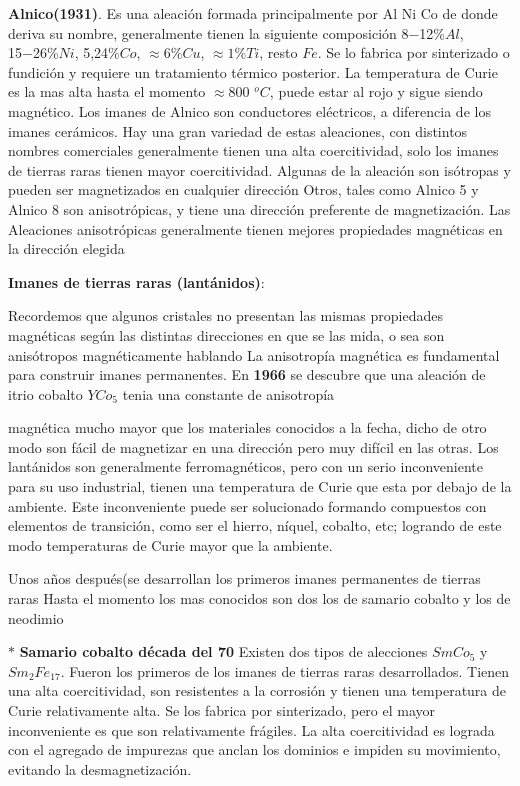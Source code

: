 \textbf{Alnico(1931)}. Es una aleación formada principalmente por Al Ni Co de donde deriva su nombre, generalmente tienen la siguiente composición 8−12\%$Al$, 15−26\%$Ni$, 5,24\%$Co$, $\approx 6 \% Cu$, $\approx 1 \% Ti$,  resto $Fe$. Se lo fabrica por sinterizado o fundición y requiere un tratamiento térmico posterior. La temperatura de Curie es la mas alta hasta el momento $\approx$800 ${^{o}C}$, puede estar al rojo y sigue siendo magnético. Los imanes de Alnico son conductores eléctricos, a diferencia de los imanes cerámicos. Hay una gran variedad de estas aleaciones, con distintos nombres comerciales generalmente tienen una alta coercitividad, solo los imanes de tierras raras tienen mayor coercitividad. Algunas de la aleación son isótropas y pueden ser magnetizados en cualquier dirección Otros, tales como Alnico 5 y Alnico 8 son anisotrópicas, y tiene una dirección preferente de magnetización. Las Aleaciones anisotrópicas generalmente tienen mejores propiedades magnéticas en la dirección elegida 

\textbf{Imanes de tierras raras (lantánidos)}:

Recordemos que algunos cristales no presentan las mismas propiedades magnéticas según las distintas direcciones en que se las mida, o sea son
anisótropos magnéticamente hablando La anisotropía magnética es fundamental para construir imanes permanentes. En \textbf{1966} se descubre que una aleación de itrio cobalto $YCo_{5}$ tenia una constante de anisotropía 

magnética mucho mayor que los materiales conocidos a la fecha, dicho de otro modo son fácil de magnetizar en una dirección pero muy difícil en las otras. Los lantánidos son generalmente ferromagnéticos, pero con un serio inconveniente para su uso industrial, tienen una temperatura de Curie que esta por debajo de la ambiente. Este inconveniente puede ser solucionado formando compuestos con elementos de transición, como ser el hierro, níquel, cobalto, etc; logrando de este modo temperaturas de Curie mayor que la ambiente. 

Unos años después(se desarrollan los primeros imanes permanentes de tierras raras Hasta el momento los mas conocidos son dos los de samario cobalto y los de neodimio

$\ast$ \textbf{Samario cobalto década del 70} Existen dos tipos de alecciones $SmCo_{5}$ y $Sm_{2}Fe_{17}$. Fueron los primeros de los imanes de tierras raras desarrollados. Tienen una alta coercitividad, son resistentes a la corrosión y tienen una temperatura de Curie relativamente alta. Se los fabrica por sinterizado, pero el mayor inconveniente es que son relativamente frágiles. La alta coercitividad es lograda con el agregado de impurezas que
anclan los dominios e impiden su movimiento, evitando la desmagnetización.

